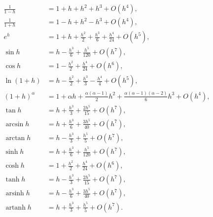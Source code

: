 \documentclass[11pt,a4paper]{ctexart}
\begin{document}
\[
\begin{aligned}
\frac1{1-h}&=1+h+h^2+h^3+O(h^4),\\
\frac1{1+h}&=1-h+h^2-h^3+O(h^4),\\
e^h&=1+h+\frac{h^2}{2}+\frac{h^3}{6}+\frac{h^4}{24}+O(h^5),\\
\sin h&=h-\frac{h^3}{6}+\frac{h^5}{120}+O(h^7),\\
\cos h&=1-\frac{h^2}{2}+\frac{h^4}{24}+O(h^6),\\
\ln(1+h)&=h-\frac{h^2}{2}+\frac{h^3}{3}-\frac{h^4}{4}+O(h^5),\\
(1+h)^\alpha
&=1+\alpha h+\frac{\alpha(\alpha-1)}{2}h^2
+\frac{\alpha(\alpha-1)(\alpha-2)}{6}h^3+O(h^4),\\
\tan h&=h+\frac{h^3}{3}+\frac{2h^5}{15}+O(h^7),\\
\arcsin h&=h+\frac{h^3}{6}+\frac{3h^5}{40}+O(h^7),\\
\arctan h&=h-\frac{h^3}{3}+\frac{h^5}{5}+O(h^7),\\
\sinh h&=h+\frac{h^3}{6}+\frac{h^5}{120}+O(h^7),\\
\cosh h&=1+\frac{h^2}{2}+\frac{h^4}{24}+O(h^6),\\
\tanh h&=h-\frac{h^3}{3}+\frac{2h^5}{15}+O(h^7),\\
\operatorname{arsinh}h&=h-\frac{h^3}{6}+\frac{3h^5}{40}+O(h^7),\\
\operatorname{artanh}h&=h+\frac{h^3}{3}+\frac{h^5}{5}+O(h^7).
\end{aligned}
\]
\end{document}
